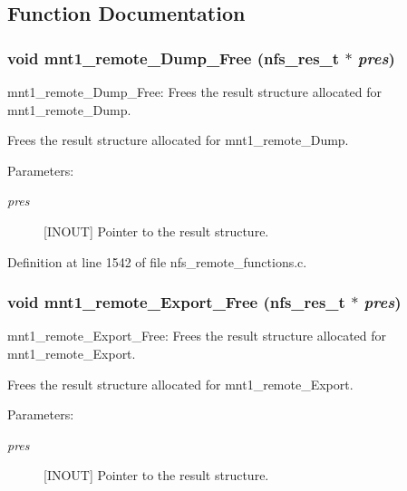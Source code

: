 \subsection{Function Documentation}
\subsubsection{\setlength{\rightskip}{0pt plus 5cm}void mnt1\_\-remote\_\-Dump\_\-Free (nfs\_\-res\_\-t $\ast$ {\em pres})}\label{group__NFSprocs_ga43}


mnt1\_\-remote\_\-Dump\_\-Free: Frees the result structure allocated for mnt1\_\-remote\_\-Dump.

Frees the result structure allocated for mnt1\_\-remote\_\-Dump.

\begin{Desc}
\item[Parameters:]
\begin{description}
\item[{\em pres}][INOUT] Pointer to the result structure. \end{description}
\end{Desc}


Definition at line 1542 of file nfs\_\-remote\_\-functions.c.
\subsubsection{\setlength{\rightskip}{0pt plus 5cm}void mnt1\_\-remote\_\-Export\_\-Free (nfs\_\-res\_\-t $\ast$ {\em pres})}\label{group__NFSprocs_ga44}


mnt1\_\-remote\_\-Export\_\-Free: Frees the result structure allocated for mnt1\_\-remote\_\-Export.

Frees the result structure allocated for mnt1\_\-remote\_\-Export.

\begin{Desc}
\item[Parameters:]
\begin{description}
\item[{\em pres}][INOUT] Pointer to the result structure. \end{description}
\end{Desc}


